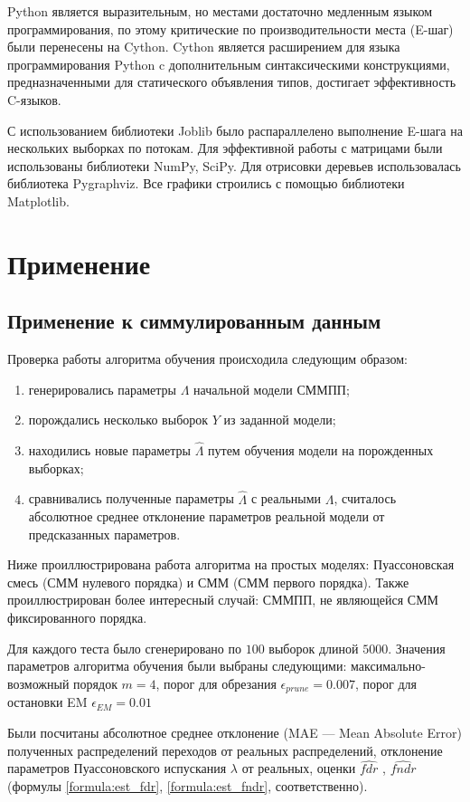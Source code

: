 \documentclass{matmex-diploma-custom}
\begin{document}
Python является выразительным, но местами достаточно медленным языком программирования, по этому критические по производительности места (E-шаг) были перенесены на Cython. Cython является расширением для языка программирования Python c дополнительным синтаксическими конструкциями, предназначенными для статического объявления типов, достигает эффективность C-языков.

С использованием библиотеки Joblib было распараллелено выполнение E-шага на нескольких выборках по потокам. Для эффективной работы с матрицами были использованы библиотеки NumPy, SciPy. Для отрисовки деревьев использовалась библиотека Pygraphviz. Все графики строились с помощью библиотеки Matplotlib.


\section{Применение}
\subsection{Применение к симмулированным данным}
Проверка работы алгоритма обучения происходила следующим образом:
\begin{enumerate}
\item
генерировались параметры $\Lambda$ начальной модели СММПП;
\item
порождались несколько выборок $ Y $ из заданной модели;
\item
находились новые параметры $\hat{\Lambda}$ путем обучения модели на порожденных выборках;
\item
сравнивались полученные параметры $\hat{\Lambda}$ с реальными $\Lambda$,
считалось абсолютное среднее отклонение параметров реальной модели от предсказанных параметров. 
\end{enumerate}

Ниже проиллюстрирована работа алгоритма на простых моделях: Пуассоновская смесь (СММ нулевого порядка) и СММ (СММ первого порядка). Также проиллюстрирован более интересный случай: СММПП, не являющейся СММ фиксированного порядка.

Для каждого теста было сгенерировано по $100$ выборок длиной $5000$.
Значения параметров алгоритма обучения были выбраны следующими: максимально-возможный порядок $m=4$, порог для обрезания $ \epsilon_{\textit{prune}} = 0.007$, порог для остановки EM $\epsilon_{\textit{EM}} =  0.01 $ 

Были посчитаны абсолютное среднее отклонение (MAE --- Mean Absolute Error) полученных распределений переходов от реальных распределений, отклонение параметров Пуассоновского испускания $\lambda$ от реальных, оценки $\hat{\textit{fdr}}$ ,  $\hat{\textit{fndr}}$ (формулы \ref{formula:est_fdr}, \ref{formula:est_fndr}, соответственно).
\end{document}
